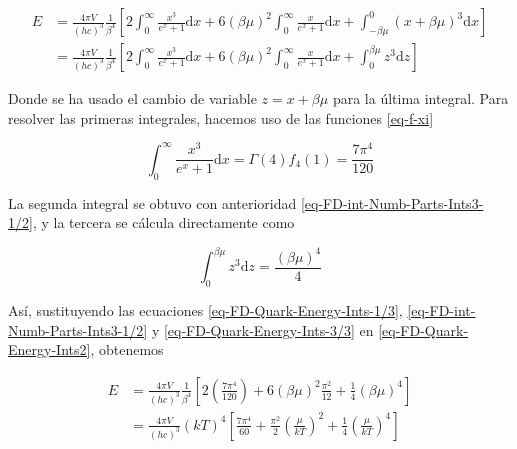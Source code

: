 \begin{equation}\label{eq-FD-Quark-Energy-Ints2}
\begin{split}
E & = \frac{4\pi V}{(hc)^{3}} \frac{1}{{\beta}^{4}} \left[2\int_{0}^{\infty} \frac{{x}^{3}}{{e}^{x} + 1} \mathrm{d}x + 6(\beta \mu)^{2} \int_{0}^{\infty} \frac{x}{{e}^{x}+1} \mathrm{d}x + \int_{-\beta \mu}^{0} \left(x + \beta \mu \right)^{3} \mathrm{d}x \right] \\
& = \frac{4\pi V}{(hc)^{3}} \frac{1}{{\beta}^{4}} \left[2\int_{0}^{\infty} \frac{{x}^{3}}{{e}^{x} + 1} \mathrm{d}x + 6(\beta \mu)^{2} \int_{0}^{\infty} \frac{x}{{e}^{x}+1} \mathrm{d}x + \int_{0}^{\beta \mu} {z}^{3} \mathrm{d}z \right]
\end{split}
\end{equation}

Donde se ha usado el cambio de variable $z=x+\beta \mu$ para la última integral. Para resolver las primeras integrales, hacemos uso de las funciones \eqref{eq-f-xi}

\begin{equation}\label{eq-FD-Quark-Energy-Ints-1/3}
\int_{0}^{\infty} \frac{{x}^{3}}{{e}^{x} + 1} \mathrm{d} x = \Gamma(4){f}_{4}(1) = \frac{7{\pi}^{4}}{120}
\end{equation}

La segunda integral se obtuvo con anterioridad \eqref{eq-FD-int-Numb-Parts-Ints3-1/2}, y la tercera se cálcula directamente como

\begin{equation}\label{eq-FD-Quark-Energy-Ints-3/3}
\int_{0}^{\beta \mu}{z}^{3} \mathrm{d}z = \frac{(\beta\mu)^{4}}{4}
\end{equation}

Así, sustituyendo las ecuaciones \eqref{eq-FD-Quark-Energy-Ints-1/3}, \eqref{eq-FD-int-Numb-Parts-Ints3-1/2} y \eqref{eq-FD-Quark-Energy-Ints-3/3} en \eqref{eq-FD-Quark-Energy-Ints2}, obtenemos

\begin{equation}
\begin{split}
E & = \frac{4\pi V}{(hc)^{3}} \frac{1}{{\beta}^{4}}  \left[2 \left(\frac{7{\pi}^{4}}{120} \right) + 6 (\beta \mu)^{2} \frac{{\pi}^{2}}{12} + \frac{1}{4}(\beta \mu)^{4}\right] \\
& = \frac{4\pi V}{(hc)^{3}} (kT)^{4} \left[\frac{7{\pi}^{4}}{60} + \frac{{\pi}^{2}}{2} \left(\frac{\mu}{kT} \right)^{2} + \frac{1}{4} \left(\frac{\mu}{kT} \right)^{4}\right]
\end{split}
\end{equation}

